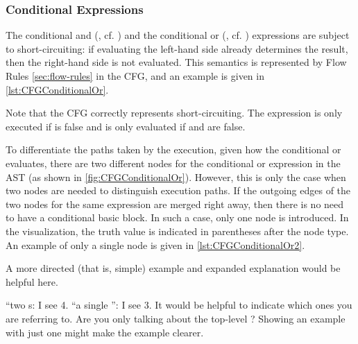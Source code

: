 
\subsubsection{Conditional Expressions}
\label{sec:cond-exp}

The conditional and (\code{&&}, cf. ) and the conditional
or (\code{||}, cf. ) expressions are subject to short-circuiting:
if evaluating the left-hand side already determines the result, then the right-hand
side is not evaluated. This semantics is represented by Flow Rules \autoref{sec:flow-rules}
in the CFG, and an example is given in \autoref{lst:CFGConditionalOr}.

Note that the CFG correctly represents short-circuiting.  The expression  is
only executed if  is false and  is only evaluated if  and 
are false.



To differentiate the paths taken by the execution, given how the conditional or evaluates,
there are two different nodes for the conditional or expression in the AST
(as shown in \autoref{fig:CFGConditionalOr}). However, this is only the case when
two nodes are needed to distinguish execution paths. If the outgoing edges
of the two nodes for the same expression are merged right away, then there is
no need to have a conditional basic block. In such a case, only one
node is introduced. In the visualization, the truth value is indicated in
parentheses after the node type. An example of only a single node is given in
\autoref{lst:CFGConditionalOr2}.

\begin{workinprogress}
A more directed (that is, simple) example and expanded explanation would be helpful here.
\end{workinprogress}


\begin{workinprogress}
  ``two s:  I see 4.  ``a single
  '': I see 3.  It would be helpful to indicate
  which ones you are referring to.  Are you only talking about the
  top-level \code{||}?  Showing an example with just one \code{||} might
  make the example clearer.
\end{workinprogress}

